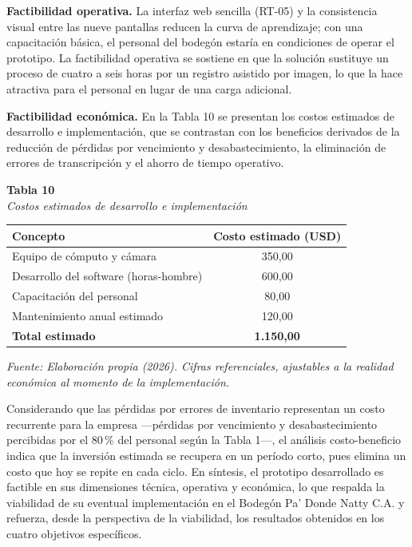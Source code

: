 \documentclass[12pt, letterpaper]{report}
\begin{document}
\textbf{Factibilidad operativa.} La interfaz web sencilla (RT-05) y la
consistencia visual entre las nueve pantallas reducen la curva de
aprendizaje; con una capacitación básica, el personal del bodegón
estaría en condiciones de operar el prototipo. La factibilidad
operativa se sostiene en que la solución sustituye un proceso de cuatro
a seis horas por un registro asistido por imagen, lo que la hace
atractiva para el personal en lugar de una carga adicional.

\textbf{Factibilidad económica.} En la Tabla 10 se presentan los
costos estimados de desarrollo e implementación, que se contrastan con
los beneficios derivados de la reducción de pérdidas por vencimiento y
desabastecimiento, la eliminación de errores de transcripción y el
ahorro de tiempo operativo.

\vspace{6pt}
%
\noindent\textbf{Tabla 10}\\
\textit{Costos estimados de desarrollo e implementación}
\vspace{4pt}

\begin{center}
\begin{tabular}{|>{\raggedright\arraybackslash}p{7.5cm}|c|}
\hline
\textbf{Concepto} & \textbf{Costo estimado (USD)} \\
\hline
Equipo de cómputo y cámara & 350,00 \\
\hline
Desarrollo del software (horas-hombre) & 600,00 \\
\hline
Capacitación del personal & 80,00 \\
\hline
Mantenimiento anual estimado & 120,00 \\
\hline
\textbf{Total estimado} & \textbf{1.150,00} \\
\hline
\end{tabular}
\end{center}
\vspace{2pt}
\noindent\small\textit{Fuente: Elaboración propia (2026). Cifras
referenciales, ajustables a la realidad económica al momento de la
implementación.}\normalsize
{}

\vspace{6pt}

Considerando que las pérdidas por errores de inventario representan un
costo recurrente para la empresa ---pérdidas por vencimiento y
desabastecimiento percibidas por el 80\,\% del personal según la Tabla
1---, el análisis costo-beneficio indica que la inversión estimada se
recupera en un período corto, pues elimina un costo que hoy se repite
en cada ciclo. En síntesis, el prototipo desarrollado es factible en
sus dimensiones técnica, operativa y económica, lo que respalda la
viabilidad de su eventual implementación en el Bodegón Pa' Donde Natty
C.A. y refuerza, desde la perspectiva de la viabilidad, los resultados
obtenidos en los cuatro objetivos específicos.
\end{document}
